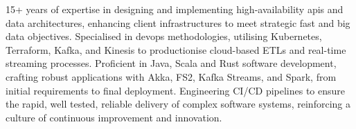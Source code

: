 

\begin{cvparagraph}

15+ years of expertise in designing and implementing high-availability apis and data architectures, enhancing client infrastructures to meet strategic fast and big data objectives.
Specialised in devops methodologies, utilising Kubernetes, Terraform, Kafka, and Kinesis to productionise cloud-based ETLs and real-time streaming processes.
Proficient in Java, Scala and Rust software development, crafting robust applications with Akka, FS2, Kafka Streams, and Spark, from initial requirements to final deployment.
Engineering CI/CD pipelines to ensure the rapid, well tested, reliable delivery of complex software systems, reinforcing a culture of continuous improvement and innovation.
\end{cvparagraph}
